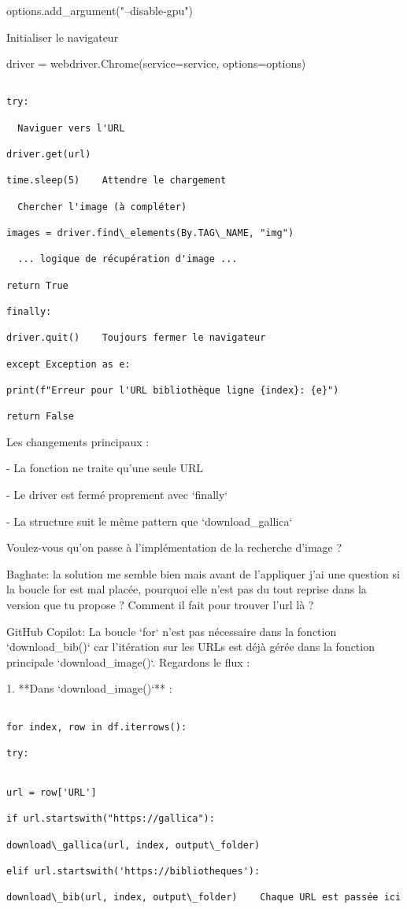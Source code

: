 options.add\_argument("--disable-gpu")

  Initialiser le navigateur

driver = webdriver.Chrome(service=service, options=options)

\begin{verbatim}

try:

  Naviguer vers l'URL

driver.get(url)

time.sleep(5)    Attendre le chargement

  Chercher l'image (à compléter)

images = driver.find\_elements(By.TAG\_NAME, "img")

  ... logique de récupération d'image ...

return True

finally:

driver.quit()    Toujours fermer le navigateur

except Exception as e:

print(f"Erreur pour l'URL bibliothèque ligne {index}: {e}")

return False

\end{verbatim}

Les changements principaux :

- La fonction ne traite qu'une seule URL

- Le driver est fermé proprement avec `finally`

- La structure suit le même pattern que `download\_gallica`

Voulez-vous qu'on passe à l'implémentation de la recherche d'image ?

Baghate: la solution me semble bien mais avant de l'appliquer j'ai une question si la boucle for est mal placée, pourquoi elle n'est pas du tout reprise dans la version que tu propose ? Comment il fait pour trouver l'url là ?

GitHub Copilot: La boucle `for` n'est pas nécessaire dans la fonction `download\_bib()` car l'itération sur les URLs est déjà gérée dans la fonction principale `download\_image()`. Regardons le flux :

1. **Dans `download\_image()`** :

\begin{verbatim}

for index, row in df.iterrows():

try:


url = row['URL']

if url.startswith("https://gallica"):

download\_gallica(url, index, output\_folder)

elif url.startswith('https://bibliotheques'):

download\_bib(url, index, output\_folder)    Chaque URL est passée ici

\end{verbatim}

